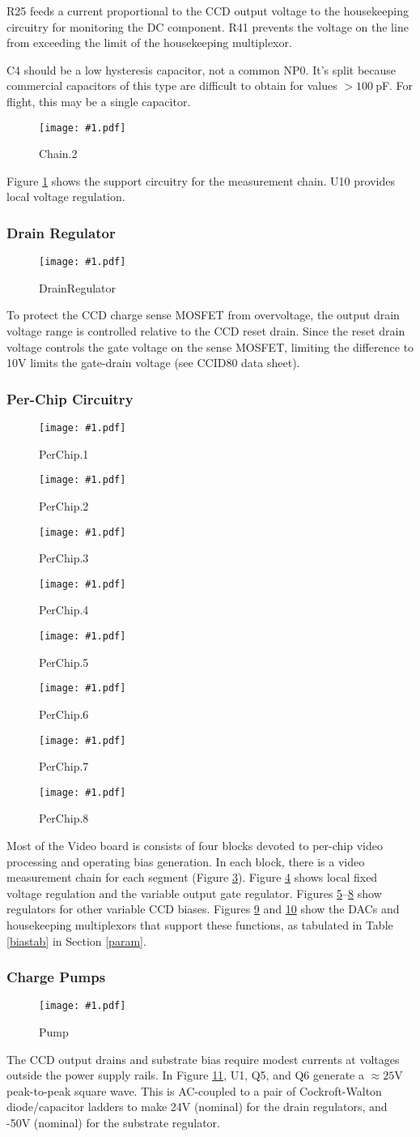 \documentclass[12pt]{article}
\let\oldsubsubsection\subsubsection
\renewcommand{\subsubsection}{\FloatBarrier\oldsubsubsection}
\newcommand{\schempage}[1]{
   \begin{figure}[ht!]
   \centerline{\texttt{[image: \#1.pdf]}}
    \caption{#1}
    \label{#1}
    \end{figure}
}
\begin{document}
R25 feeds a current proportional to the CCD output voltage to the housekeeping circuitry for monitoring the DC component. R41 prevents the voltage on the line from exceeding the limit of the housekeeping multiplexor.

C4 should be a low hysteresis capacitor, not a common NP0. It's split because commercial capacitors of this type are difficult to obtain for values $>100\ $pF. For flight, this may be a single capacitor.

\schempage{Chain.2}
Figure \ref{Chain.2} shows the support circuitry for the measurement chain. U10 provides local voltage regulation.
\subsubsection{Drain Regulator}
\schempage{DrainRegulator}
To protect the CCD charge sense MOSFET from overvoltage, the output drain voltage range is controlled relative to the CCD reset drain.  Since the reset drain voltage controls the gate voltage on the sense MOSFET, limiting the difference to 10V limits the gate-drain voltage (see CCID80 data sheet).
\subsubsection{Per-Chip Circuitry}
\schempage{PerChip.1}
\schempage{PerChip.2}
\schempage{PerChip.3}
\schempage{PerChip.4}
\schempage{PerChip.5}
\schempage{PerChip.6}
\schempage{PerChip.7}
\schempage{PerChip.8}
Most of the Video board is consists of four blocks devoted to per-chip video processing and operating bias generation. In each block, there is a video measurement chain for each segment (Figure \ref{PerChip.1}).
Figure \ref{PerChip.2} shows local fixed voltage regulation and the variable output gate regulator. Figures \ref{PerChip.3}--\ref{PerChip.6} show regulators for other variable CCD biases. Figures \ref{PerChip.7} and \ref{PerChip.8} show the DACs and housekeeping multiplexors that support these functions, as tabulated in
Table \ref{biastab} in Section \ref{param}.
\subsubsection{Charge Pumps}
\schempage{Pump}
The CCD output drains and substrate bias require modest currents at voltages outside the power supply rails. In Figure \ref{Pump}, U1, Q5, and Q6 generate a $\approx25$V peak-to-peak square wave. This is AC-coupled to a pair of Cockroft-Walton diode/capacitor ladders to make 24V (nominal) for the drain regulators, and -50V (nominal) for the substrate regulator.
\end{document}
